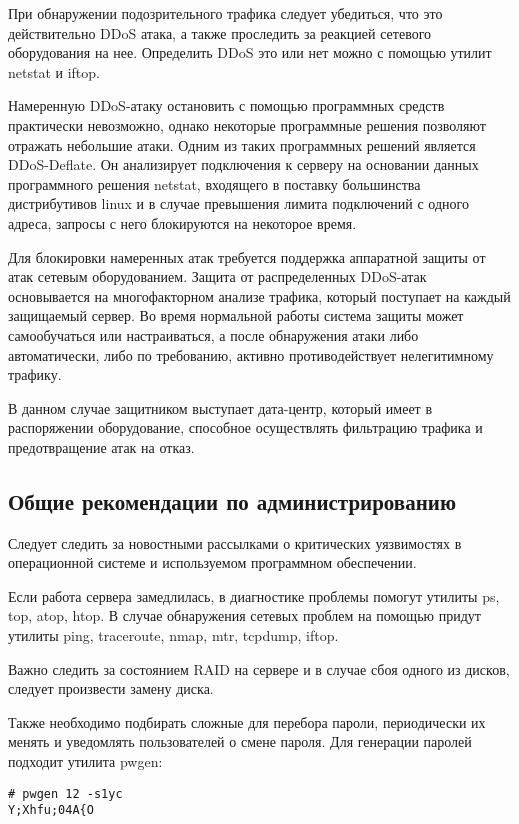 При обнаружении подозрительного трафика следует убедиться, что это действительно DDoS атака, а также проследить за реакцией сетевого оборудования на нее.
Определить DDoS это или нет можно с помощью утилит netstat и iftop.

Намеренную DDoS-атаку остановить с помощью программных средств практически невозможно, однако некоторые программные решения позволяют отражать небольшие атаки.
Одним из таких программных решений является DDoS-Deflate.
Он анализирует подключения к серверу на основании данных программного решения netstat, входящего в поставку большинства дистрибутивов linux и в случае превышения лимита подключений с одного адреса, запросы с него блокируются на некоторое время.

Для блокировки намеренных атак требуется поддержка аппаратной защиты от атак сетевым оборудованием.
Защита от распределенных DDoS-атак основывается на мно­го­фак­тор­ном анализе трафика, который поступает на каждый защищаемый сервер.
Во время нормальной работы система защиты может самообучаться или настраиваться, а после обнаружения атаки либо автоматически, либо по требованию, активно про­тиво­дей­ству­ет нелегитимному трафику.

В данном случае защитником выступает дата-центр, который имеет в распоряжении оборудование, способное осуществлять фильтрацию трафика и предотвращение атак на отказ.

\subsection{Общие рекомендации по администрированию}

Следует следить за новостными рассылками о критических уязвимостях в операционной системе и используемом программном обеспечении.

Если работа сервера замедлилась, в диагностике проблемы помогут утилиты ps, top, atop, htop.
В случае обнаружения сетевых проблем на помощью придут утилиты ping, traceroute, nmap, mtr, tcpdump, iftop.

Важно следить за состоянием RAID на сервере и в случае сбоя одного из дисков, следует произвести замену диска.

Также необходимо подбирать сложные для перебора пароли, периодически их менять и уведомлять пользователей о смене пароля.
Для генерации паролей подходит утилита pwgen:
\begin{lstlisting}
# pwgen 12 -s1yc
Y;Xhfu;04A{O
\end{lstlisting}

